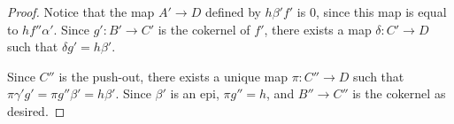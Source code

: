 \begin{proof}
Notice that the map $A' \to D$ defined by $h \beta' f'$ is 
$0$, since this map is equal to $h f'' \alpha'$. Since $g': B' 
\to C'$ is the cokernel of $f'$, there exists a map $\delta: C'
\to D$ such that $\delta g' = h \beta'$.

Since $C''$ is the push-out, there exists a unique map $\pi: C''
\to D$ such that $\pi \gamma' g' = \pi g'' \beta' = h \beta'$.
Since $\beta'$ is an epi, $\pi g'' = h$, and $B'' \to C''$ is the 
cokernel as desired.
\end{proof}
